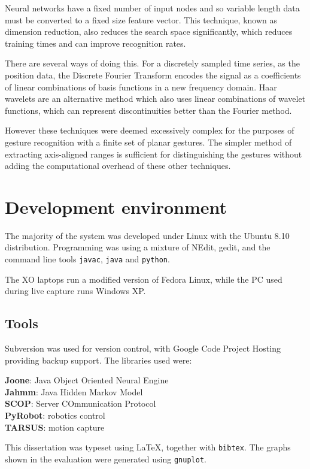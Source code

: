 \documentclass[12pt,a4,notitlepage]{report}
\renewcommand{\_}{\texttt{\symbol{95}}}
\newcommand{\<}{\texttt{\symbol{60}}}
\renewcommand{\>}{\texttt{\symbol{62}}}
\begin{document}
Neural networks have a fixed number of input nodes and so variable length data must be converted to a fixed size feature vector. This technique, known as dimension reduction, also reduces the search space significantly, which reduces training times and can improve recognition rates.

There are several ways of doing this. For a discretely sampled time series, as the position data, the Discrete Fourier Transform encodes the signal as a coefficients of linear combinations of basis functions in a new frequency domain. Haar wavelets are an alternative method which also uses linear combinations of wavelet functions, which can represent discontinuities better than the Fourier method.

However these techniques were deemed excessively complex for the purposes of gesture recognition with a finite set of planar gestures. The simpler method of extracting axis-aligned ranges is sufficient for distinguishing the gestures without adding the computational overhead of these other techniques.

\section{Development environment}

The majority of the system was developed under Linux with the Ubuntu 8.10 distribution. Programming was using a mixture of NEdit, gedit, and the command line tools \texttt{javac}, \texttt{java} and \texttt{python}.

The XO laptops run a modified version of Fedora Linux, while the PC used during live capture runs Windows XP.

\subsection{Tools}

Subversion was used for version control, with Google Code Project Hosting providing backup support. The libraries used were:

\textbf{Joone}: Java Object Oriented Neural Engine \cite{Joone}\\
\textbf{Jahmm}: Java Hidden Markov Model \cite{Jahmm} \\
\textbf{SCOP}: Server COmmunication Protocol \cite{SCOP} \\
\textbf{PyRobot}: robotics control \\
\textbf{TARSUS}: motion capture

This dissertation was typeset using \LaTeX, together with \texttt{bibtex}. The graphs shown in the evaluation were generated using \texttt{gnuplot}.
\end{document}
